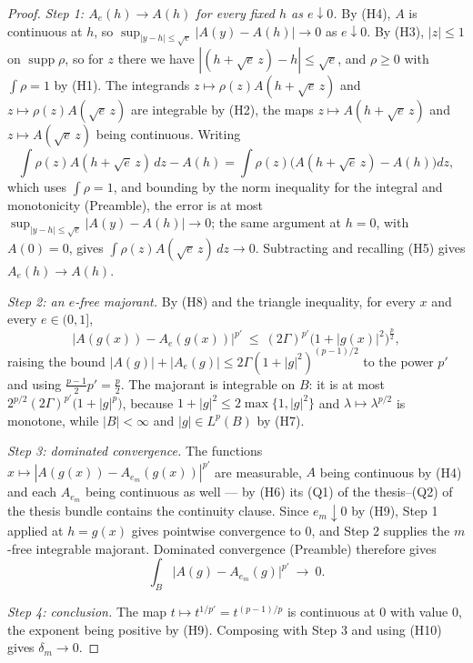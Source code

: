 \begin{proof}
\emph{Step 1: $A_e(h)\to A(h)$ for every fixed $h$ as $e\downarrow0$.}  By
(H4), $A$ is continuous at $h$, so
$\sup_{|y-h|\le\sqrt e}|A(y)-A(h)|\to0$ as $e\downarrow0$.  By (H3), $|z|\le1$
on $\operatorname{supp}\rho$, so for $z$ there we have
$|(h+\sqrt e\,z)-h|\le\sqrt e$, and $\rho\ge0$ with $\int\rho=1$ by (H1).  The
integrands $z\mapsto\rho(z)A(h+\sqrt e\,z)$ and $z\mapsto\rho(z)A(\sqrt e\,z)$
are integrable by (H2), the maps $z\mapsto A(h+\sqrt e\,z)$ and
$z\mapsto A(\sqrt e\,z)$ being continuous.  Writing
\[
\int\rho(z)A(h+\sqrt e\,z)\,dz-A(h)
=\int\rho(z)\bigl(A(h+\sqrt e\,z)-A(h)\bigr)dz,
\]
which uses $\int\rho=1$, and bounding by the norm inequality for the integral
and monotonicity (Preamble), the error is at most
$\sup_{|y-h|\le\sqrt e}|A(y)-A(h)|\to0$; the same argument at $h=0$, with
$A(0)=0$, gives $\int\rho(z)A(\sqrt e\,z)\,dz\to0$.  Subtracting and recalling
(H5) gives $A_e(h)\to A(h)$.

\emph{Step 2: an $e$-free majorant.}  By (H8) and the triangle inequality, for
every $x$ and every $e\in(0,1]$,
\[
\bigl|A(g(x))-A_e(g(x))\bigr|^{p'}
\ \le\ (2\Gamma)^{p'}\bigl(1+|g(x)|^2\bigr)^{\frac p2},
\]
raising the bound $|A(g)|+|A_e(g)|\le2\Gamma(1+|g|^2)^{(p-1)/2}$ to the power
$p'$ and using $\tfrac{p-1}2p'=\tfrac p2$.  The majorant is integrable on $B$:
it is at most $2^{p/2}(2\Gamma)^{p'}\bigl(1+|g|^{p}\bigr)$, because
$1+|g|^2\le2\max\{1,|g|^2\}$ and $\lambda\mapsto\lambda^{p/2}$ is monotone,
while $|B|<\infty$ and $|g|\in L^{p}(B)$ by (H7).

\emph{Step 3: dominated convergence.}  The functions
$x\mapsto|A(g(x))-A_{e_m}(g(x))|^{p'}$ are measurable, $A$ being continuous by
(H4) and each $A_{e_m}$ being continuous as well --- by (H6) its
(Q1) of the thesis--(Q2) of the thesis bundle contains the continuity clause.  Since
$e_m\downarrow0$ by (H9), Step 1 applied at $h=g(x)$ gives pointwise
convergence to $0$, and Step 2 supplies the $m$-free integrable majorant.
Dominated convergence (Preamble) therefore gives
\[
\int_B\bigl|A(g)-A_{e_m}(g)\bigr|^{p'}\ \longrightarrow\ 0 .
\]

\emph{Step 4: conclusion.}  The map $t\mapsto t^{1/p'}=t^{(p-1)/p}$ is
continuous at $0$ with value $0$, the exponent being positive by (H9).
Composing with Step 3 and using (H10) gives $\delta_m\to0$.
\end{proof}
